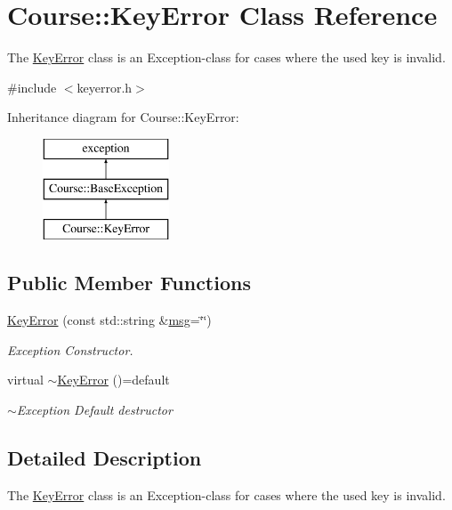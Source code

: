 \hypertarget{classCourse_1_1KeyError}{\section{Course\-:\-:Key\-Error Class Reference}
\label{classCourse_1_1KeyError}
}


The \hyperlink{classCourse_1_1KeyError}{Key\-Error} class is an Exception-\/class for cases where the used key is invalid.  




{\ttfamily \#include $<$keyerror.\-h$>$}

Inheritance diagram for Course\-:\-:Key\-Error\-:\begin{figure}[H]
\begin{center}
\leavevmode
\includegraphics[height=3.000000cm]{classCourse_1_1KeyError}
\end{center}
\end{figure}
\subsection*{Public Member Functions}
\begin{DoxyCompactItemize}
\item 
\hyperlink{classCourse_1_1KeyError_a99407655a8d0d86cb3d7daf6765a601c}{Key\-Error} (const std\-::string \&\hyperlink{classCourse_1_1BaseException_ac5a744a6af6f2ba9198b58e52bb62f5a}{msg}=\char`\"{}\char`\"{})
\begin{DoxyCompactList}\small\item\em Exception Constructor. \end{DoxyCompactList}\item 
virtual \hyperlink{classCourse_1_1KeyError_a48b0429d954fd992dc29f44437ae056c}{$\sim$\-Key\-Error} ()=default
\begin{DoxyCompactList}\small\item\em $\sim$\-Exception Default destructor \end{DoxyCompactList}\end{DoxyCompactItemize}


\subsection{Detailed Description}
The \hyperlink{classCourse_1_1KeyError}{Key\-Error} class is an Exception-\/class for cases where the used key is invalid. 

